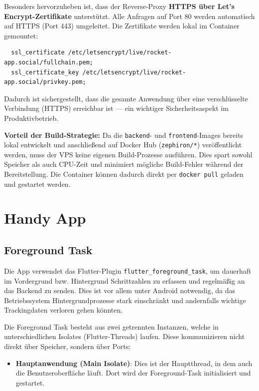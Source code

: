 \documentclass[11pt,a4paper]{article}
\begin{document}
\begin{itemize}
  Besonders hervorzuheben ist, dass der Reverse-Proxy \textbf{HTTPS über Let's Encrypt-Zertifikate} unterstützt. Alle Anfragen auf Port 80 werden automatisch auf HTTPS (Port 443) umgeleitet. Die Zertifikate werden lokal im Container gemountet:

  \begin{lstlisting}
  ssl_certificate /etc/letsencrypt/live/rocket-app.social/fullchain.pem;
  ssl_certificate_key /etc/letsencrypt/live/rocket-app.social/privkey.pem;
  \end{lstlisting}

  Dadurch ist sichergestellt, dass die gesamte Anwendung über eine verschlüsselte Verbindung (HTTPS) erreichbar ist — ein wichtiger Sicherheitsaspekt im Produktivbetrieb.
\end{itemize}

\vspace{1em}

\textbf{Vorteil der Build-Strategie:}  
Da die \texttt{backend}- und \texttt{frontend}-Images bereits lokal entwickelt und anschließend auf Docker Hub (\texttt{zephiron/*}) veröffentlicht werden, muss der VPS keine eigenen Build-Prozesse ausführen. Dies spart sowohl Speicher als auch CPU-Zeit und minimiert mögliche Build-Fehler während der Bereitstellung. Die Container können dadurch direkt per \texttt{docker pull} geladen und gestartet werden.


\section{Handy App}
\subsection{Foreground Task}

Die App verwendet das Flutter-Plugin \texttt{flutter\_foreground\_task}\cite{flutter_foreground_task}, um dauerhaft im Vordergrund bzw. Hintergrund Schrittzahlen zu erfassen und regelmäßig an das Backend zu senden. Dies ist vor allem unter Android notwendig, da das Betriebssystem Hintergrundprozesse stark einschränkt und andernfalls wichtige Trackingdaten verloren gehen könnten.

Die Foreground Task besteht aus zwei getrennten Instanzen, welche in unterschiedlichen Isolates (Flutter-Threads) laufen. Diese kommunizieren nicht direkt über Speicher, sondern über Ports:

\begin{itemize}[leftmargin=1.5em]
    \item \textbf{Hauptanwendung (Main Isolate)}: Dies ist der Hauptthread, in dem auch die Benutzeroberfläche läuft. Dort wird der Foreground-Task initialisiert und gestartet.
\end{itemize}
\end{document}

